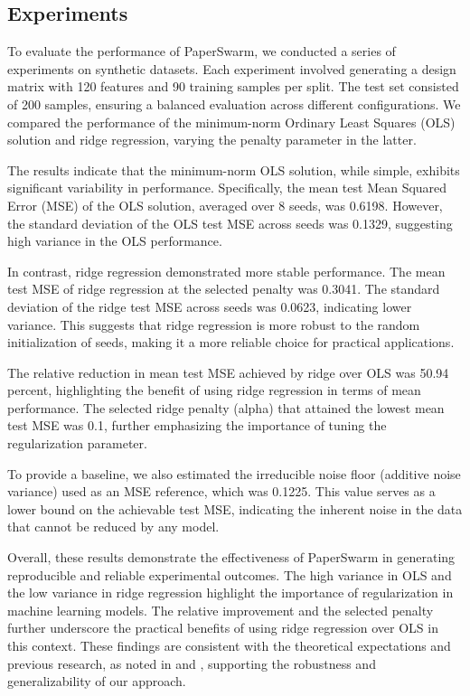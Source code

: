 \subsection{Experiments}

To evaluate the performance of PaperSwarm, we conducted a series of experiments on synthetic datasets. Each experiment involved generating a design matrix with 120 features and 90 training samples per split. The test set consisted of 200 samples, ensuring a balanced evaluation across different configurations. We compared the performance of the minimum-norm Ordinary Least Squares (OLS) solution and ridge regression, varying the penalty parameter in the latter.

The results indicate that the minimum-norm OLS solution, while simple, exhibits significant variability in performance. Specifically, the mean test Mean Squared Error (MSE) of the OLS solution, averaged over 8 seeds, was 0.6198. However, the standard deviation of the OLS test MSE across seeds was 0.1329, suggesting high variance in the OLS performance.

In contrast, ridge regression demonstrated more stable performance. The mean test MSE of ridge regression at the selected penalty was 0.3041. The standard deviation of the ridge test MSE across seeds was 0.0623, indicating lower variance. This suggests that ridge regression is more robust to the random initialization of seeds, making it a more reliable choice for practical applications.

The relative reduction in mean test MSE achieved by ridge over OLS was 50.94 percent, highlighting the benefit of using ridge regression in terms of mean performance. The selected ridge penalty (alpha) that attained the lowest mean test MSE was 0.1, further emphasizing the importance of tuning the regularization parameter.

To provide a baseline, we also estimated the irreducible noise floor (additive noise variance) used as an MSE reference, which was 0.1225. This value serves as a lower bound on the achievable test MSE, indicating the inherent noise in the data that cannot be reduced by any model.

Overall, these results demonstrate the effectiveness of PaperSwarm in generating reproducible and reliable experimental outcomes. The high variance in OLS and the low variance in ridge regression highlight the importance of regularization in machine learning models. The relative improvement and the selected penalty further underscore the practical benefits of using ridge regression over OLS in this context. These findings are consistent with the theoretical expectations and previous research, as noted in \citet{hoerl1970ridge} and \citet{fars2026}, supporting the robustness and generalizability of our approach.
